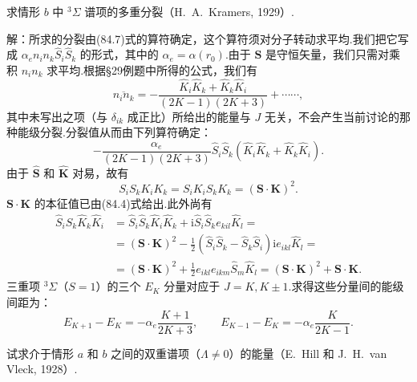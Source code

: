 \begin{xiti}

\quad 求情形 $b$ 中 $^3\Sigma$ 谱项的多重分裂（H.~A.~Kramers, 1929）.

解：所求的分裂由(84.7)式的算符确定，这个算符须对分子转动求平均.我们把它写成 $\alpha_e n_i n_k\hat{S}_i\hat{S}_k$ 的形式，其中的 $\alpha_e=\alpha(r_0)$.由于 $\boldsymbol{S}$ 是守恒矢量，我们只需对乘积 $n_in_k$ 求平均.根据§29例题中所得的公式，我们有
\begin{equation*}
  \overline{n_in_k}=-\frac{\hat{K}_i\hat{K}_k+\hat{K}_k\hat{K}_i}{(2K-1)(2K+3)}+\cdots\cdots,
\end{equation*}
其中未写出之项（与 $\delta_{ik}$ 成正比）所给出的能量与 $J$ 无关，不会产生当前讨论的那种能级分裂.分裂值从而由下列算符确定：
\begin{equation*}
  -\frac{\alpha_e}{(2K-1)(2K+3)}\hat{S}_i\hat{S}_k
  (\hat{K}_i\hat{K}_k+\hat{K}_k\hat{K}_i).
\end{equation*}
由于 $\hat{\boldsymbol{S}}$ 和 $\hat{\boldsymbol{K}}$ 对易，故有
\begin{equation*}
  S_iS_kK_iK_k=S_iK_iS_kK_k=(\boldsymbol{S}\cdot\boldsymbol{K})^2.
\end{equation*}
$\boldsymbol{S}\cdot\boldsymbol{K}$ 的本征值已由(84.4)式给出.此外尚有
\begin{equation*}
\begin{aligned}
  \hat{S}_i\hat{S}_k\hat{K}_k\hat{K}_i
  &=\hat{S}_i\hat{S}_k\hat{K}_i\hat{K}_k+\mathrm{i}\hat{S}_i\hat{S}_ke_{kil}\hat{K}_l=\\
  &=(\boldsymbol{S}\cdot\boldsymbol{K})^2
  -\frac{1}{2}(\hat{S}_i\hat{S}_k-\hat{S}_k\hat{S}_i)\mathrm{i}e_{ikl}\hat{K}_l=\\
  &=(\boldsymbol{S}\cdot\boldsymbol{K})^2
  +\frac{1}{2}e_{ikl}e_{ikm}\hat{S}_m\hat{K}_l
  =(\boldsymbol{S}\cdot\boldsymbol{K})^2+\boldsymbol{S}\cdot\boldsymbol{K}.
\end{aligned}
\end{equation*}
三重项 $^3\Sigma$（$S=1$）的三个 $E_K$ 分量对应于 $J=K,K\pm1$.求得这些分量间的能级间距为：
\begin{equation*}
  E_{K+1}-E_K=-\alpha_e\frac{K+1}{2K+3},\qquad
  E_{K-1}-E_K=-\alpha_e\frac{K}{2K-1}.
\end{equation*}

\quad 试求介于情形 $a$ 和 $b$ 之间的双重谱项（$\Lambda\neq0$）的能量（E.~Hill 和 J.~H.~van Vleck, 1928）.


\end{xiti}

